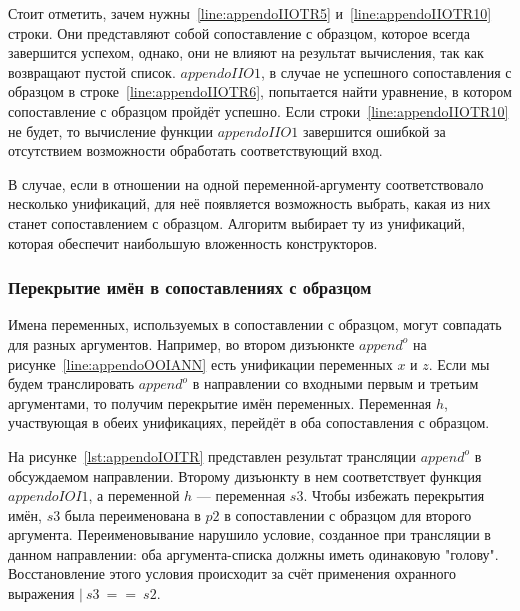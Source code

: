 Стоит отметить, зачем нужны~\ref{line:appendoIIOTR5} и~\ref{line:appendoIIOTR10} строки.
Они представляют собой сопоставление с образцом, которое всегда завершится успехом, однако, они не влияют на результат вычисления, так как возвращают пустой список.
$appendoIIO1$, в случае не успешного сопоставления с образцом в строке~\ref{line:appendoIIOTR6}, попытается найти уравнение, в котором сопоставление с образцом пройдёт успешно.
Если строки~\ref{line:appendoIIOTR10} не будет, то вычисление функции $appendoIIO1$ завершится ошибкой за отсутствием возможности обработать соответствующий вход.

В случае, если в отношении на \miniKanren{} одной переменной-аргументу соответствовало несколько унификаций, для неё появляется возможность выбрать, какая из них станет сопоставлением с образцом.
Алгоритм выбирает ту из унификаций, которая обеспечит наибольшую вложенность конструкторов.


\subsubsection{Перекрытие имён в сопоставлениях с образцом}

Имена переменных, используемых в сопоставлении с образцом, могут совпадать для разных аргументов.
Например, во втором дизъюнкте $append^o$ на рисунке~\ref{line:appendoOOIANN} есть унификации переменных $x$ и $z$.
Если мы будем транслировать $append^o$ в направлении со входными первым и третьим аргументами, то получим перекрытие имён переменных.
Переменная $h$, участвующая в обеих унификациях, перейдёт в оба сопоставления с образцом.

На рисунке~\ref{lst:appendoIOITR} представлен результат трансляции $append^o$ в обсуждаемом направлении.
Второму дизъюнкту в нем соответствует функция $appendoIOI1$, а переменной $h$ --- переменная $s3$.
Чтобы избежать перекрытия имён, $s3$ была переименована в $p2$ в сопоставлении с образцом для второго аргумента.
Переименовывание нарушило условие, созданное при трансляции в данном направлении: оба аргумента-списка должны иметь одинаковую "голову".
Восстановление этого условия происходит за счёт применения охранного выражения $|~s3~==~s2$.

